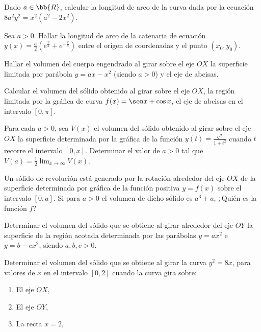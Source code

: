 \begin{ejercicio}
    Dado $a\in \bb{R}$, calcular la longitud de arco de la curva dada por la ecuación $8a^2y^2=x^2(a^2-2x^2)$.
\end{ejercicio}

\begin{ejercicio}
    Sea $a>0$. Hallar la longitud de arco de la catenaria de ecuación $y(x)=\frac{a}{2}\left(e^{\frac{x}{a}} + e^{-\frac{x}{a}}\right)$ entre el origen de coordenadas y el punto $(x_0,y_0)$.
\end{ejercicio}

\begin{ejercicio}
    Hallar el volumen del cuerpo engendrado al girar sobre el eje $OX$ la superficie limitada por parábola $y=ax-x^2$ (siendo $a>0$) y el eje de abcisas.
\end{ejercicio}

\begin{ejercicio}
    Calcular el volumen del sólido obtenido al girar sobre el eje $OX$, la región limitada por la gráfica de curva $f(x)= \sen x+\cos x$, el eje de abcisas en el intervalo $[0, \pi]$.
\end{ejercicio}

\begin{ejercicio}
    Para cada $a>0$, sea $V(x)$ el volumen del sólido obtenido al girar sobre el eje $OX$ la superficie determinada por la gráfica de la función $y(t)=\frac{\sqrt{t}}{1+t^2}$ cuando $t$ recorre el intervalo $[0,x]$. Determinar el valor de $a>0$ tal que $\displaystyle V(a)=\frac{1}{2}\lim_{x\to \infty}V(x)$.
\end{ejercicio}

\begin{ejercicio}
    Un sólido de revolución está generado por la rotación alrededor del eje $OX$ de la superficie determinada por gráfica de la función positiva $y=f(x)$ sobre el intervalo $[0,a]$. Si para $a>0$ el volumen de dicho sólido es $a^3+a$, ¿Quién es la función $f$?
\end{ejercicio}

\begin{ejercicio}
    Determinar el volumen del sólido que se obtiene al girar alrededor del eje $OY$ la superficie de la región acotada determinada por las parábolas $y=ax^2$ e $y=b-cx^2$, siendo $a,b,c>0$.
\end{ejercicio}

\begin{ejercicio}
    Determinar el volumen del sólido que se obtiene al girar la curva $y^2=8x$, para valores de $x$ en el intervalo $[0,2]$ cuando la curva gira sobre:
    \begin{enumerate}
        \item El eje $OX$,
        \item El eje $OY$,
        \item La recta $x=2$,
    \end{enumerate}
\end{ejercicio}


